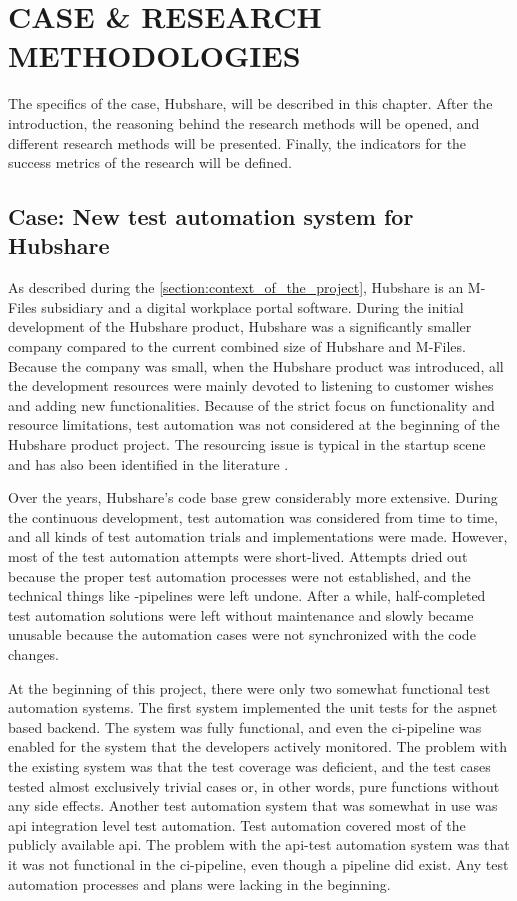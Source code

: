 \chapter{CASE \& RESEARCH METHODOLOGIES}\label{chapter:case_and_research_methodologies}
The specifics of the case, Hubshare, will be described in this chapter. After the introduction, the reasoning behind the research methods will be opened, and different research methods will be presented. Finally, the indicators for the success metrics of the research will be defined.

\section{Case: New test automation system for Hubshare}\label{section:case_new_test_automation_system_for_hubshare}
As described during the \autoref{section:context_of_the_project}, Hubshare is an M-Files subsidiary and a digital workplace portal software. During the initial development of the Hubshare product, Hubshare was a significantly smaller company compared to the current combined size of Hubshare and M-Files. Because the company was small, when the Hubshare product was introduced, all the development resources were mainly devoted to listening to customer wishes and adding new functionalities. Because of the strict focus on functionality and resource limitations, test automation was not considered at the beginning of the Hubshare product project. The resourcing issue is typical in the startup scene and has also been identified in the literature \cite{laukkanen2018comparison}.

Over the years, Hubshare's code base grew considerably more extensive. During the continuous development, test automation was considered from time to time, and all kinds of test automation trials and implementations were made. However, most of the test automation attempts were short-lived. Attempts dried out because the proper test automation processes were not established, and the technical things like -pipelines were left undone. After a while, half-completed test automation solutions were left without maintenance and slowly became unusable because the automation cases were not synchronized with the code changes.

At the beginning of this project, there were only two somewhat functional test automation systems. The first system implemented the unit tests for the \gls{aspnet} based backend. The system was fully functional, and even the \gls{ci}-pipeline was enabled for the system that the developers actively monitored. The problem with the existing system was that the test coverage was deficient, and the test cases tested almost exclusively trivial cases or, in other words, pure functions without any side effects. Another test automation system that was somewhat in use was \gls{api} integration level test automation. Test automation covered most of the publicly available \gls{api}. The problem with the \gls{api}-test automation system was that it was not functional in the \gls{ci}-pipeline, even though a pipeline did exist. Any test automation processes and plans were lacking in the beginning.

